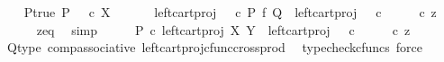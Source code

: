 \begin{isabellebody}
\ \ \isamarkupfalse%
\ P{\isacharunderscore}{\kern0pt}true{\isacharcolon}{\kern0pt}\ {\isachardoublequoteopen}P\ {\isacharequal}{\kern0pt}\ {\isasymt}\ {\isasymcirc}\isactrlsub c\ {\isasymbeta}\isactrlbsub X\isactrlesub {\isachardoublequoteclose}\isanewline
\ \ \isanewline
\ \ \isamarkupfalse%
\ {\isachardoublequoteopen}left{\isacharunderscore}{\kern0pt}cart{\isacharunderscore}{\kern0pt}proj\ {\isasymOmega}\ {\isasymOmega}\ {\isasymcirc}\isactrlsub c\ {\isacharparenleft}{\kern0pt}P\ {\isasymtimes}\isactrlsub f\ Q{\isacharparenright}{\kern0pt}\ {\isacharequal}{\kern0pt}\ left{\isacharunderscore}{\kern0pt}cart{\isacharunderscore}{\kern0pt}proj\ {\isasymOmega}\ {\isasymOmega}\ {\isasymcirc}\isactrlsub c\ {\isacharparenleft}{\kern0pt}{\isasymlangle}{\isasymt}{\isacharcomma}{\kern0pt}{\isasymt}{\isasymrangle}\ {\isasymamalg}\ {\isasymlangle}{\isasymf}{\isacharcomma}{\kern0pt}{\isasymf}{\isasymrangle}\ {\isasymamalg}\ {\isasymlangle}{\isasymf}{\isacharcomma}{\kern0pt}{\isasymt}{\isasymrangle}{\isacharparenright}{\kern0pt}\ {\isasymcirc}\isactrlsub c\ z{\isachardoublequoteclose}\isanewline
\ \ \ \ \isamarkupfalse%
\ z{\isacharunderscore}{\kern0pt}eq\ \isamarkupfalse%
\ simp\isanewline
\ \ \isamarkupfalse%
\ \isamarkupfalse%
\ {\isachardoublequoteopen}P\ {\isasymcirc}\isactrlsub c\ left{\isacharunderscore}{\kern0pt}cart{\isacharunderscore}{\kern0pt}proj\ X\ Y\ {\isacharequal}{\kern0pt}\ {\isacharparenleft}{\kern0pt}left{\isacharunderscore}{\kern0pt}cart{\isacharunderscore}{\kern0pt}proj\ {\isasymOmega}\ {\isasymOmega}\ {\isasymcirc}\isactrlsub c\ {\isacharparenleft}{\kern0pt}{\isasymlangle}{\isasymt}{\isacharcomma}{\kern0pt}{\isasymt}{\isasymrangle}\ {\isasymamalg}\ {\isasymlangle}{\isasymf}{\isacharcomma}{\kern0pt}{\isasymf}{\isasymrangle}\ {\isasymamalg}\ {\isasymlangle}{\isasymf}{\isacharcomma}{\kern0pt}{\isasymt}{\isasymrangle}{\isacharparenright}{\kern0pt}{\isacharparenright}{\kern0pt}\ {\isasymcirc}\isactrlsub c\ z{\isachardoublequoteclose}\isanewline
\ \ \ \ \isamarkupfalse%
\ Q{\isacharunderscore}{\kern0pt}type\ comp{\isacharunderscore}{\kern0pt}associative{}\ left{\isacharunderscore}{\kern0pt}cart{\isacharunderscore}{\kern0pt}proj{\isacharunderscore}{\kern0pt}cfunc{\isacharunderscore}{\kern0pt}cross{\isacharunderscore}{\kern0pt}prod\ \isamarkupfalse%
\ {\isacharparenleft}{\kern0pt}typecheck{\isacharunderscore}{\kern0pt}cfuncs{\isacharcomma}{\kern0pt}\ force{\isacharparenright}{\kern0pt}\isanewline
\ \ \isamarkupfalse%

\end{isabellebody}

